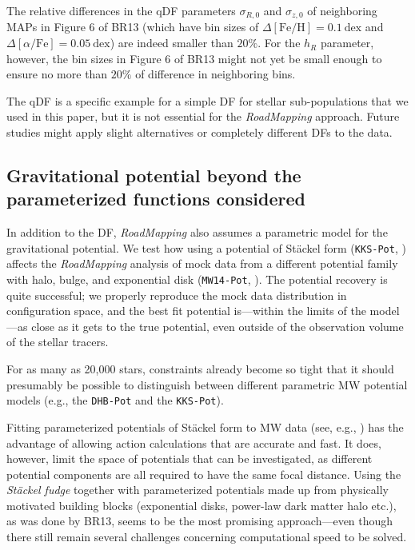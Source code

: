 \documentclass[iop,revtex4,numberedappendix,appendixfloats]{emulateapj}
\newcommand{\MAPs}{MAPs}
\newcommand{\RM}{{\sl RoadMapping}}
\begin{document}
The relative differences in the qDF parameters $\sigma_{R,0}$ and $\sigma_{z,0}$ of neighboring \MAPs{} in Figure 6 of BR13 (which have bin sizes of $\Delta [\mathrm{Fe}/\mathrm{H}] = 0.1~\text{dex}$ and $\Delta [\alpha/\mathrm{Fe}] = 0.05~\text{dex}$) are indeed smaller than $20\%$. For the $h_R$ parameter, however, the bin sizes in Figure 6 of BR13 might not yet be small enough to ensure no more than $20\%$ of difference in neighboring bins.

The qDF is a specific example for a simple DF for stellar sub-populations that we used in this paper, but it is not essential for the \RM{} approach. Future studies might apply slight alternatives or completely different DFs to the data.\\

\subsection{Gravitational potential beyond the parameterized functions considered} 

In addition to the DF, \RM{} also assumes a parametric model for the gravitational potential. We test how using a potential of St\"{a}ckel form (\texttt{KKS-Pot}, \citealt{1994AA...287...43B}) affects the \RM{} analysis of mock data from a different potential family with halo, bulge, and exponential disk (\texttt{MW14-Pot}, \citealt{2015ApJS..216...29B}). The potential recovery is quite successful; we properly reproduce the mock data distribution in configuration space, and the best fit potential is---within the limits of the model---as close as it gets to the true potential, even outside of the observation volume of the stellar tracers. 

For as many as 20,000 stars, constraints already become so tight that it should presumably be possible to distinguish between different parametric MW potential models (e.g., the \texttt{DHB-Pot} and the \texttt{KKS-Pot}).

Fitting parameterized potentials of St\"{a}ckel form to MW data (see, e.g., \citealt{1994AA...287...43B,2003MNRAS.340..752F}) has the advantage of allowing action calculations that are accurate and fast. It does, however, limit the space of potentials that can be investigated, as different potential components are all required to have the same focal distance. Using the \emph{St\"{a}ckel fudge} \citep{2012MNRAS.426.1324B} together with parameterized potentials made up from physically motivated building blocks (exponential disks, power-law dark matter halo etc.), as was done by BR13, seems to be the most promising approach---even though there still remain several challenges concerning computational speed to be solved.
\end{document}
